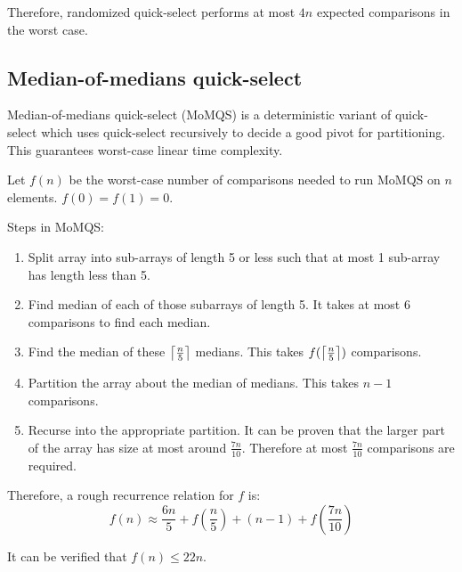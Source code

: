 Therefore, randomized quick-select performs at most $4n$ expected comparisons
in the worst case.

\subsection{Median-of-medians quick-select}

Median-of-medians quick-select (MoMQS) is a deterministic variant of quick-select which uses
quick-select recursively to decide a good pivot for partitioning.
This guarantees worst-case linear time complexity.

Let $f(n)$ be the worst-case number of comparisons needed to run MoMQS on $n$ elements.
$f(0) = f(1) = 0$.

Steps in MoMQS:
\begin{enumerate}
\item Split array into sub-arrays of length 5 or less such that at most 1 sub-array has length less than 5.
\item Find median of each of those subarrays of length 5.
    It takes at most 6 comparisons \cite{selection-comparisons-table} to find each median.
\item Find the median of these $\left\lceil \frac{n}{5} \right\rceil$ medians. This takes $f(\left\lceil \frac{n}{5} \right\rceil)$ comparisons.
\item Partition the array about the median of medians. This takes $n-1$ comparisons.
\item Recurse into the appropriate partition. It can be proven that the larger part of
    the array has size at most around $\frac{7n}{10}$. Therefore at most $\frac{7n}{10}$ comparisons are required.
\end{enumerate}

Therefore, a rough recurrence relation for $f$ is:
\[ f(n) \approx \frac{6n}{5} + f\left(\frac{n}{5}\right) + (n-1) + f\left(\frac{7n}{10}\right) \]

It can be verified that $f(n) \le 22n$.

\addMyBib{}


